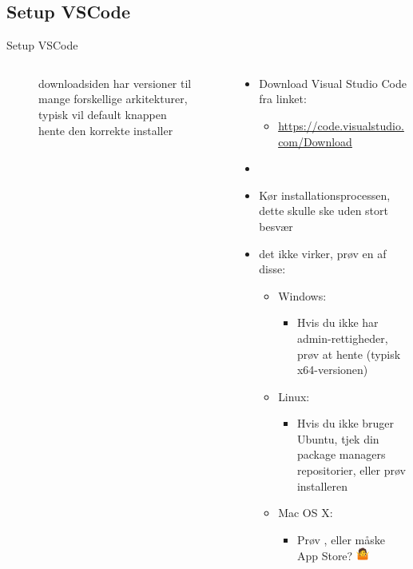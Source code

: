 \documentclass[aspectratio=169]{beamer}
\begin{document}
\subsection{Setup VSCode}
\begin{frame}{Setup VSCode}
\begin{columns}
	\begin{column}{0.5\textwidth}
		\begin{figure}
  			\caption{ downloadsiden har versioner til mange forskellige arkitekturer, typisk vil default knappen hente den korrekte installer}
  			\label{fig:vscode-dl}
		\end{figure}
	\end{column}
	\begin{column}{0.5\textwidth}
		\begin{textBox}
			\begin{itemize}
				\item Download Visual Studio Code fra linket:
				\begin{itemize}
					 \item \small\url{https://code.visualstudio.com/Download}
				\end{itemize}
				\item {}
				\item Kør installationsprocessen, dette skulle ske uden stort besvær
				\item {} det ikke virker, prøv en af disse:
				\begin{itemize}
					\item Windows:
					\begin{itemize}
						\item Hvis du ikke har admin-rettigheder, prøv at hente  (typisk x64-versionen)
					\end{itemize}
					\item Linux:
					\begin{itemize}
						\item Hvis du ikke bruger Ubuntu, tjek din package managers repositorier, eller prøv  installeren
					\end{itemize}
					\item Mac OS X:
					\begin{itemize}
						\item Prøv , eller måske App Store?  \includegraphics[height=12pt, keepaspectratio=true]{assets/pictures/shrug.png}
					\end{itemize}
				\end{itemize}
			\end{itemize}
		\end{textBox}
	\end{column}
\end{columns}
\end{frame}
\end{document}
